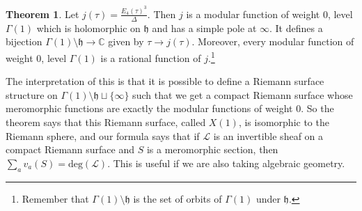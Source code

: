 \documentclass{article}
\theoremstyle{definition}
\newtheorem{theorem}{Theorem}[section]
\begin{document}
\begin{theorem}
    Let $j(\tau) = \frac{E_4(\tau)^3}{\Delta}$. Then $j$ is a modular function of weight $0$, level $\Gamma(1)$ which is holomorphic on $\mathfrak{h}$ and has a simple pole at $\infty$. It defines a bijection $\Gamma(1)\setminus \mathfrak{h} \to \mathbb{C}$ given by $\tau \to j (\tau)$. Moreover, every modular function of weight 0, level $\Gamma(1)$ is a rational function of $j$.\footnote{Remember that $\Gamma(1)\setminus \mathfrak{h}$ is the set of orbits of $\Gamma(1)$ under $\mathfrak{h}$.}
\end{theorem}
The interpretation of this is that it is possible to define a Riemann surface structure on $\Gamma(1)\setminus \mathfrak{h} \sqcup \{\infty\}$ such that we get a compact Riemann surface whose meromorphic functions are exactly the modular functions of weight 0. So the theorem says that this Riemann surface, called $X(1)$, is isomorphic to the Riemann sphere, and our formula says that if $\mathcal{L}$ is an invertible sheaf on a compact Riemann surface and $S$ is a meromorphic section, then $\sum_{a}^{} v_a(S) = \text{deg}(\mathcal{L})$. This is useful if we are also taking algebraic geometry.

\end{document}
